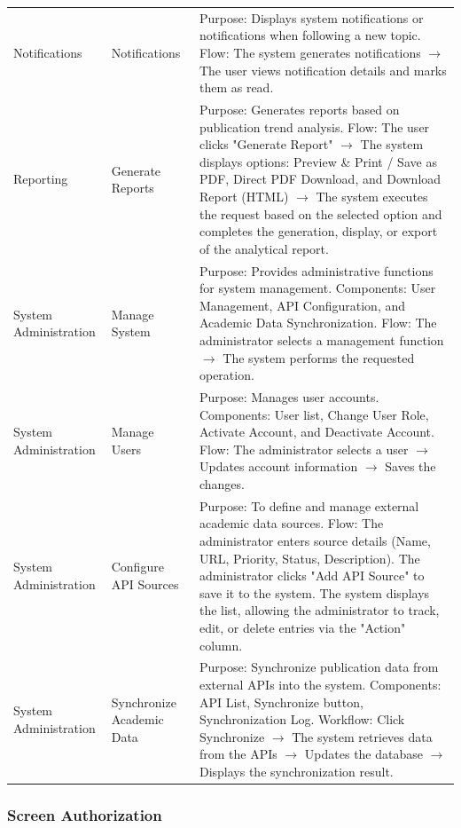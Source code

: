 \documentclass[12pt,a4paper]{article}
\begin{document}
{\begin{longtable}{|>{\raggedright\arraybackslash}p{}|>{\raggedright\arraybackslash}p{}|>{\raggedright\arraybackslash}p{}|}
		Notifications &
		Notifications &
		Purpose: Displays system notifications or notifications when following a new topic. Flow: The system generates notifications $\rightarrow$ The user views notification details and marks them as read. \\
		
		Reporting &
		Generate Reports &
		Purpose: Generates reports based on publication trend analysis. Flow: The user clicks "Generate Report" $\rightarrow$ The system displays options: Preview \& Print / Save as PDF, Direct PDF Download, and Download Report (HTML) $\rightarrow$ The system executes the request based on the selected option and completes the generation, display, or export of the analytical report. \\
		
		System Administration &
		Manage System &
		Purpose: Provides administrative functions for system management. Components: User Management, API Configuration, and Academic Data Synchronization. Flow: The administrator selects a management function $\rightarrow$ The system performs the requested operation. \\
		
		System Administration &
		Manage Users &
		Purpose: Manages user accounts. Components: User list, Change User Role, Activate Account, and Deactivate Account. Flow: The administrator selects a user $\rightarrow$ Updates account information $\rightarrow$ Saves the changes. \\
		
		System Administration &
		Configure API Sources &
		Purpose: To define and manage external academic data sources. Flow: The administrator enters source details (Name, URL, Priority, Status, Description). The administrator clicks "Add API Source" to save it to the system. The system displays the list, allowing the administrator to track, edit, or delete entries via the "Action" column. \\
		
		System Administration &
		Synchronize Academic Data &
		Purpose: Synchronize publication data from external APIs into the system. Components: API List, Synchronize button, Synchronization Log. Workflow: Click Synchronize $\rightarrow$ The system retrieves data from the APIs $\rightarrow$ Updates the database $\rightarrow$ Displays the synchronization result. \\
		
	\end{longtable}
\subsubsection{Screen Authorization}

}
\end{document}
